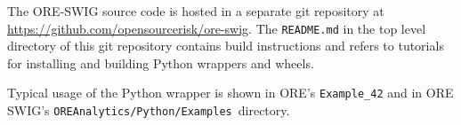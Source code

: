 \documentclass[12pt, a4paper]{article}
\begin{document}
\medskip
The ORE-SWIG source code is hosted in a separate git repository at \url{https://github.com/opensourcerisk/ore-swig}.
The {\tt README.md} in the top level directory of this git repository contains build instructions and refers to tutorials 
for installing and building Python wrappers and wheels.

\medskip
Typical usage of the Python wrapper is shown in ORE's {\tt Example\_42} and in ORE SWIG's {\tt OREAnalytics/Python/Examples} directory.

%
\end{document}
